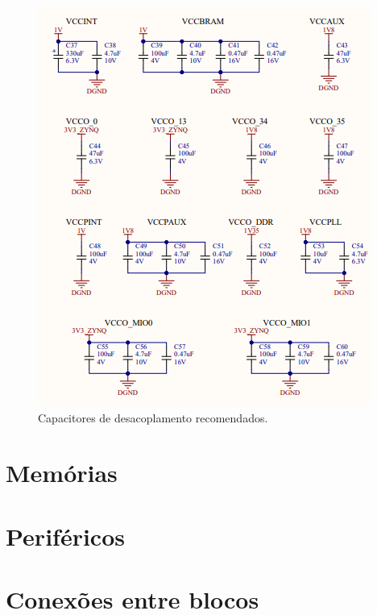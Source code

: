 \begin{figure}[H]
    \centering
    \includegraphics[scale=0.7]{images/zynqcaps.png}
    \caption{Capacitores de desacoplamento recomendados.}
    \label{fig:zcaps}
\end{figure}

\section{Memórias}

\section{Periféricos}

\section{Conexões entre blocos}